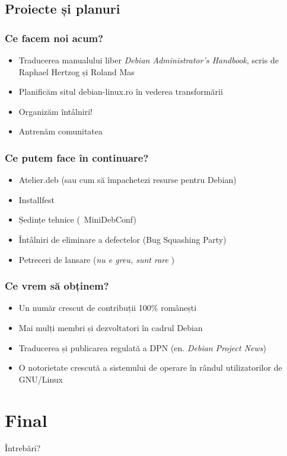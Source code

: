\documentclass[xcolor=dvipsnames]{beamer}
\begin{document}
\subsection{Proiecte și planuri}
\begin{frame}
\frametitle{Ce facem noi acum?}
\begin{itemize}
\item Traducerea manualului liber \emph{Debian Administrator's Handbook}, scris de Raphael Hertzog și Roland Mas
\item Planificăm situl debian-linux.ro în vederea transformării
\item Organizăm întâlniri!
\item Antrenăm comunitatea
\end{itemize}
\end{frame}

\begin{frame}
\frametitle{Ce putem face în continuare?}
\begin{itemize}
\item Atelier.deb (sau cum să împachetezi resurse pentru Debian)
\item Installfest
\item Ședințe tehnice (~MiniDebConf)
\item Întâlniri de eliminare a defectelor (Bug Squashing Party)
\item Petreceri de lansare (\emph{nu e greu, sunt rare} \smiley )
\end{itemize}
\end{frame}

\begin{frame}
\frametitle{Ce vrem să obținem?}
\begin{itemize}
\item Un număr crescut de contribuții 100\% românești
\item Mai mulți membri și dezvoltatori în cadrul Debian
\item Traducerea și publicarea regulată a DPN (en. \emph{Debian Project News})
\item O notorietate crescută a sistemului de operare în rândul utilizatorilor de GNU/Linux
\end{itemize}
\end{frame}


\section{Final} 
\begin{frame}
\centerline{Întrebări?}
\end{frame}
\end{document}
